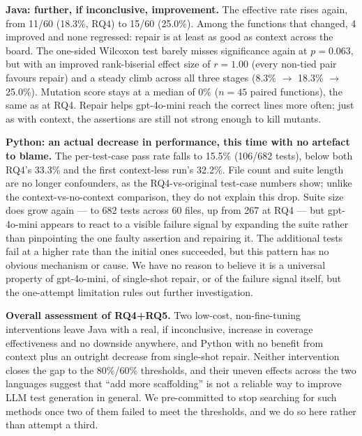 \textbf{Java: further, if inconclusive, improvement.} The effective rate rises again, from
11/60 (18.3\%, RQ4) to 15/60 (25.0\%). Among the functions that changed, 4 improved and
none regressed: repair is at least as good as context across the board. The one-sided
Wilcoxon test barely misses significance again at $p=0.063$, but with an improved
rank-biserial effect size of $r=1.00$ (every non-tied pair favours repair) and a steady
climb across all three stages (8.3\% $\to$ 18.3\% $\to$ 25.0\%). Mutation score stays at a
median of 0\% ($n=45$ paired functions), the same as at RQ4. Repair helps gpt-4o-mini
reach the correct lines more often; just as with context, the assertions are still not
strong enough to kill mutants.

\textbf{Python: an actual decrease in performance, this time with no artefact to blame.}
The per-test-case pass rate falls to 15.5\% (106/682 tests), below both RQ4's 33.3\% and
the first context-less run's 32.2\%. File count and suite length are no longer confounders,
as the RQ4-vs-original test-case numbers show; unlike the context-vs-no-context comparison,
they do not explain this drop. Suite size does grow again --- to 682 tests across 60 files,
up from 267 at RQ4 --- but gpt-4o-mini appears to react to a visible failure signal by
expanding the suite rather than pinpointing the one faulty assertion and repairing it. The
additional tests fail at a higher rate than the initial ones succeeded, but this pattern
has no obvious mechanism or cause. We have no reason to believe it is a universal property
of gpt-4o-mini, of single-shot repair, or of the failure signal itself, but the
one-attempt limitation rules out further investigation.

\textbf{Overall assessment of RQ4+RQ5.} Two low-cost, non-fine-tuning interventions leave
Java with a real, if inconclusive, increase in coverage effectiveness and no downside
anywhere, and Python with no benefit from context plus an outright decrease from
single-shot repair. Neither intervention closes the gap to the 80\%/60\% thresholds, and
their uneven effects across the two languages suggest that ``add more scaffolding'' is not
a reliable way to improve LLM test generation in general. We pre-committed to stop
searching for such methods once two of them failed to meet the thresholds, and we do so
here rather than attempt a third.
